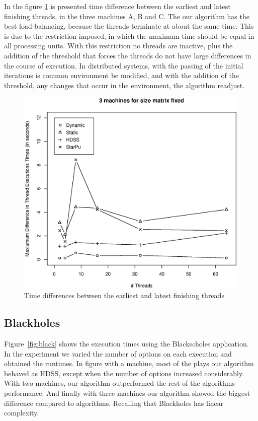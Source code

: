\documentclass[journal]{IEEEtran}
\begin{document}
In the figure \ref{fig:diferencaThreads} is presented time difference between the earliest and latest finishing threads, in the three machines A, B and C. The our algorithm has the best load-balancing, because the threads terminate at about the same time. This is due to the restriction imposed, in which the maximum time should be equal in all processing units. With this restriction no threads are inactive, plus the addition of the threshold that forces the threads do not have large differences in the course of execution. In distributed systems, with the passing of the initial iterations is common environment be modified, and with the addition of the threshold, any changes that occur in the environment, the algorithm readjust.

\begin{figure}[htb]
	\begin{center}
	\centering
			\includegraphics[scale=0.3]{MaximaDiferenca.eps}
	\caption{Time differences between the earliest and latest finishing threads}
	\label{fig:diferencaThreads}
	\end{center}
\end{figure}


\subsection{Blackholes}

Figure~\ref{fig:black} shows the execution times using the Blackscholes
application. In the experiment we varied the number of options on each
execution and obtained the runtimes. In figure with a machine, most of the plays our algorithm behaved as HDSS, except when the number of options increased considerably. With two machines, our algorithm outperformed the rest of the algorithms performance. And finally with three machines our algorithm showed the biggest difference compared to algorithms. Recalling that Blackholes has linear complexity. 
\end{document}
